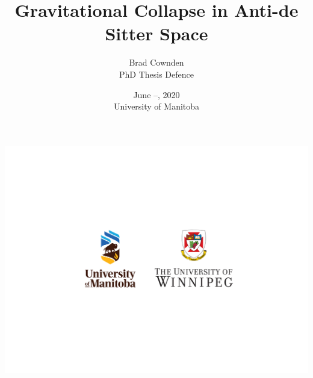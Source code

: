 \documentclass[mathserif,10pt]{beamer}
\title[Gravitational Collapse in AdS]{Gravitational Collapse in Anti-de Sitter Space}
\author[Brad Cownden]{Brad Cownden \\ PhD Thesis Defence}
\date[June --, 2020 UM]{June --, 2020 \\ University of Manitoba}
\begin{document}

\frame
{
   \titlepage
   \begin{center}
   \includegraphics[scale=0.25]{newlogos}
   \end{center}
}

\frame
{
  \frametitle{}
  \tableofcontents
}
\end{document}
